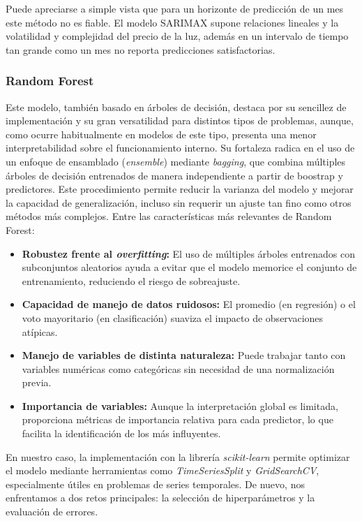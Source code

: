 Puede apreciarse a simple vista que para un horizonte de predicción de un mes este método no es fiable. El modelo SARIMAX supone relaciones lineales y la volatilidad y complejidad del precio de la luz, además en un intervalo de tiempo tan grande como un mes no reporta predicciones satisfactorias.
%
%
%
\subsubsection{Random Forest}
%
%
%
Este modelo, también basado en árboles de decisión, destaca por su sencillez de implementación y su gran versatilidad para distintos tipos de problemas, aunque, como ocurre habitualmente en modelos de este tipo, presenta una menor interpretabilidad sobre el funcionamiento interno. Su fortaleza radica en el uso de un enfoque de ensamblado (\textit{ensemble}) mediante \textit{bagging}, que combina múltiples árboles de decisión entrenados de manera independiente a partir de boostrap y predictores. Este procedimiento permite reducir la varianza del modelo y mejorar la capacidad de generalización, incluso sin requerir un ajuste tan fino como otros métodos más complejos. Entre las características más relevantes de Random Forest:

\begin{itemize}
    \item \textbf{Robustez frente al \textit{overfitting}:} El uso de múltiples árboles entrenados con subconjuntos aleatorios ayuda a evitar que el modelo memorice el conjunto de entrenamiento, reduciendo el riesgo de sobreajuste.
    \item \textbf{Capacidad de manejo de datos ruidosos:} El promedio (en regresión) o el voto mayoritario (en clasificación) suaviza el impacto de observaciones atípicas.
    \item \textbf{Manejo de variables de distinta naturaleza:} Puede trabajar tanto con variables numéricas como categóricas sin necesidad de una normalización previa.
    \item \textbf{Importancia de variables:} Aunque la interpretación global es limitada, proporciona métricas de importancia relativa para cada predictor, lo que facilita la identificación de los más influyentes.
\end{itemize}

En nuestro caso, la implementación con la librería \textit{scikit-learn} permite optimizar el modelo mediante herramientas como \textit{TimeSeriesSplit} y \textit{GridSearchCV}, especialmente útiles en problemas de series temporales. De nuevo, nos enfrentamos a dos retos principales: la selección de hiperparámetros y la evaluación de errores.

